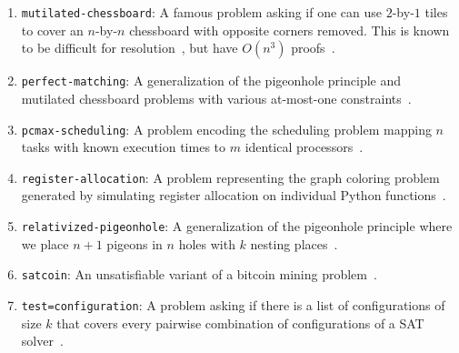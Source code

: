 \begin{enumerate}
    \item \texttt{mutilated-chessboard}: A famous problem asking if one can use
    $2$-by-$1$ tiles to cover an $n$-by-$n$ chessboard with opposite corners
    removed. This is known to be difficult for
    resolution~\cite{mutilatedchessboard-exponential}, but have $O(n^3)$ \pr
    proofs~\cite{mutilatedchessboard-pr}.
    \item \texttt{perfect-matching}: A generalization of the pigeonhole
    principle and mutilated chessboard problems with various at-most-one
    constraints~\cite{bipartgen}.
    \item \texttt{pcmax-scheduling}: A problem encoding the scheduling problem
    mapping $n$ tasks with known execution times to $m$ identical
    processors~\cite{pcmax}.
    \item \texttt{register-allocation}: A problem representing the graph
    coloring problem generated by simulating register allocation on individual
    Python functions~\cite{register-allocation}.
    \item \texttt{relativized-pigeonhole}: A generalization of the pigeonhole
    principle where we place $n+1$ pigeons in $n$ holes with $k$ nesting
    places~\cite{relativized-pigeonhole}.
    \item \texttt{satcoin}: An unsatisfiable variant of a bitcoin mining
    problem~\cite{satcoin}.
    \item \texttt{test=configuration}: A problem asking if there is a list of
    configurations of size $k$ that covers every pairwise combination of
    configurations of a SAT solver~\cite{test-configuration}.
\end{enumerate}

